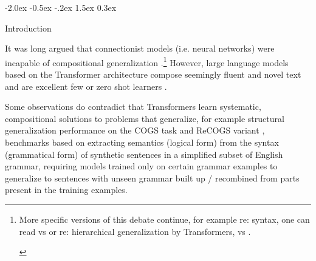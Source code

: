 \documentclass[11pt]{article}
\makeatletter
\renewcommand\section{\@startsection{section}{1}{\z@}%
                                  {-2.0ex \@plus -0.5ex \@minus -.2ex}%
                                  {1.5ex \@plus 0.3ex}%
                                  {\large\bfseries\raggedright}}
\makeatother
\begin{document}
\section{Introduction}

It was long argued that connectionist models (i.e. neural networks) were incapable of compositional generalization \citep{FodorPylyshyn1988}.\footnote{\begin{footnotesize}
More specific versions of this debate continue, for example re: syntax, one can read \citep{vanschijndel2019quantitydoesntbuyquality} vs \citep{goldberg2019assessingbertssyntacticabilities} or re: hierarchical generalization by Transformers, \citep{petty2021transformersgeneralizelinearly} vs \citep{murty2023grokkinghierarchicalstructurevanilla}.\end{footnotesize}} 
However, large language models based on the Transformer architecture \citep{vaswani2017attention} compose seemingly fluent and novel text and are excellent few or zero shot learners \citep{Brown2020}.

Some observations do contradict that Transformers learn systematic, compositional solutions to problems that generalize, for example structural generalization performance on the COGS task \citep{KimLinzen2020} and ReCOGS variant \citep{Wu2023} , benchmarks based on extracting semantics (logical form) from the syntax (grammatical form) of synthetic sentences in a simplified subset of English grammar, requiring models trained only on certain grammar examples to generalize to sentences with unseen grammar built up / recombined from parts present in the training examples.
\end{document}
